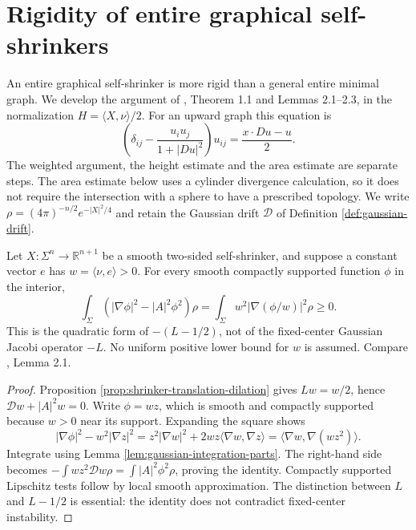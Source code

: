 \chapter{Rigidity of entire graphical self-shrinkers}\label{sec:entire-graphical-shrinkers}
An entire graphical self-shrinker is more rigid than a general entire minimal graph. We develop the argument of \cite{Wang09}, Theorem 1.1 and Lemmas 2.1--2.3, in the normalization $H=\langle X,\nu\rangle/2$. For an upward graph this equation is
\[
 \left(\delta_{ij}-\frac{u_i u_j}{1+|Du|^2}\right)u_{ij}
       =\frac{x\cdot Du-u}{2}.
\]
The weighted argument, the height estimate and the area estimate are separate steps. The area estimate below uses a cylinder divergence calculation, so it does not require the intersection with a sphere to have a prescribed topology. We write $\rho=(4\pi)^{-n/2}e^{-|X|^2/4}$ and retain the Gaussian drift $\mathcal D$ of Definition \ref{def:gaussian-drift}.

\begin{proposition}\label{prop:shrinker-positive-angle-ground-state}
Let $X:\Sigma^n\to\mathbb R^{n+1}$ be a smooth two-sided self-shrinker, and suppose a constant vector $e$ has $w=\langle\nu,e\rangle>0$. For every smooth compactly supported function $\phi$ in the interior,
\[
 \int_\Sigma (|\nabla\phi|^2-|A|^2\phi^2)\rho
    =\int_\Sigma w^2|\nabla(\phi/w)|^2\rho\geq0.
\]
This is the quadratic form of $-(L-1/2)$, not of the fixed-center Gaussian Jacobi operator $-L$. No uniform positive lower bound for $w$ is assumed. Compare \cite{Wang09}, Lemma 2.1.
\end{proposition}
\begin{proof}
Proposition \ref{prop:shrinker-translation-dilation} gives $Lw=w/2$, hence $\mathcal Dw+|A|^2w=0$. Write $\phi=wz$, which is smooth and compactly supported because $w>0$ near its support. Expanding the square shows
\[
 |\nabla\phi|^2-w^2|\nabla z|^2
  =z^2|\nabla w|^2+2wz\langle\nabla w,\nabla z\rangle
  =\langle\nabla w,\nabla(wz^2)\rangle.
\]
Integrate using Lemma \ref{lem:gaussian-integration-parts}. The right-hand side becomes $-\int wz^2\mathcal Dw\rho=\int|A|^2\phi^2\rho$, proving the identity. Compactly supported Lipschitz tests follow by local smooth approximation. The distinction between $L$ and $L-1/2$ is essential: the identity does not contradict fixed-center instability.
\end{proof}

